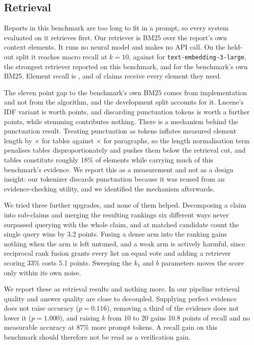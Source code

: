 \documentclass{article}
\begin{document}
\subsection{Retrieval}
\label{sec:retrieval}

Reports in this benchmark are too long to fit in a prompt, so every system evaluated on it
retrieves first. Our retriever is BM25 \citep{robertson2009bm25} over the report's own
context elements. It runs no neural model and makes no API call. On the held-out split it
reaches \recallOursTest{} macro recall at $k{=}10$, against \recallEmbedTest{} for
\texttt{text-embedding-3-large}, the strongest retriever reported on this benchmark, and
\recallUpstreamBMTest{} for the benchmark's own BM25. Element recall is
\recallElementTest{}, and \recallAllGoldTest{} of claims receive every element they need.

The eleven point gap to the benchmark's own BM25 comes from implementation and not from
the algorithm, and the development split accounts for it. Lucene's IDF variant is worth
\ablationIDF{} points, and discarding punctuation tokens is worth a further
\ablationPunct{} points, while stemming contributes nothing. There is a mechanism behind
the punctuation result. Treating punctuation as tokens inflates measured element length by
\tableInflation{}$\times$ for tables against \paraInflation{}$\times$ for paragraphs, so
the length normalisation term penalises tables disproportionately and pushes them below
the retrieval cut, and tables constitute roughly 18\% of elements while carrying much of
this benchmark's evidence. We report this as a measurement and not as a design insight:
our tokenizer discards punctuation because it was reused from an evidence-checking
utility, and we identified the mechanism afterwards.

We tried three further upgrades, and none of them helped. Decomposing a claim into
sub-claims and merging the resulting rankings six different ways never surpassed querying
with the whole claim, and at matched candidate count the single query wins by 3.2 points.
Fusing a dense arm into the ranking gains nothing when the arm is left untuned, and a weak
arm is actively harmful, since reciprocal rank fusion grants every list an equal vote and
adding a retriever scoring 33\% costs 5.1 points. Sweeping the $k_1$ and $b$ parameters
moves the score only within its own noise.

We report these as retrieval results and nothing more. In our pipeline retrieval quality
and answer quality are close to decoupled. Supplying perfect evidence does not raise
accuracy ($p = 0.116$), removing a third of the evidence does not lower it ($p = 1.000$),
and raising $k$ from 10 to 20 gains 10.8 points of recall and no measurable accuracy at
87\% more prompt tokens. A recall gain on this benchmark should therefore not be read as a
verification gain.
\end{document}

